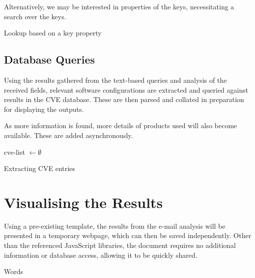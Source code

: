 Alternatively, we may be interested in properties of the keys, necessitating a search over the keys.

\begin{algorithm}
	\caption{Lookup based on a key property}
\end{algorithm}

\subsection{Database Queries}

Using the results gathered from the text-based queries and analysis of the
received fields, relevant software configurations are extracted and queried
against results in the CVE database.  These are then parsed and collated in
preparation for displaying the outputs.

As more information is found, more details of products used will also become
available.  These are added asynchronously.

\begin{algorithm}
	cve-list $\gets\emptyset$\;
	\;
	\caption{Extracting CVE entries}
\end{algorithm}

\section{Visualising the Results}

Using a pre-existing template, the results from the e-mail analysis will be
presented in a temporary webpage, which can then be saved independently.  Other
than the referenced JavaScript libraries, the document requires no additional
information or database access, allowing it to be quickly shared.

\begin{algorithm}\caption{Words}
\end{algorithm}
